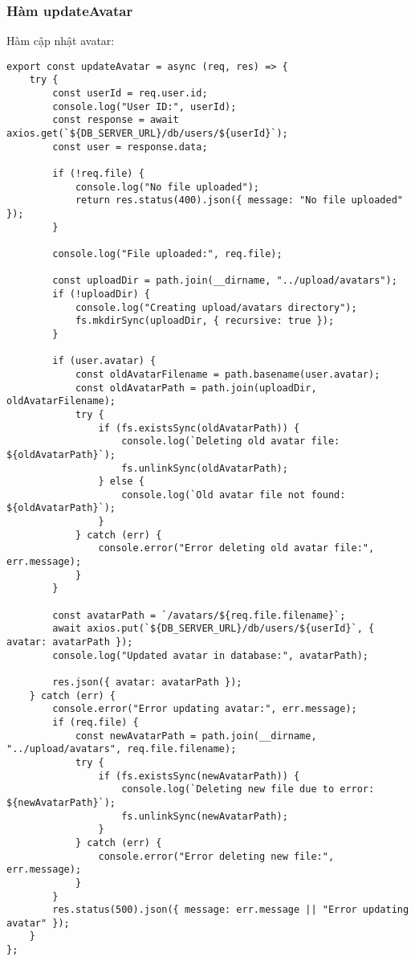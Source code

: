             \subsubsection{Hàm updateAvatar}
                \hspace*{0.6cm}Hàm cập nhật avatar:
                \begin{lstlisting}
export const updateAvatar = async (req, res) => {
    try {
        const userId = req.user.id;
        console.log("User ID:", userId);
        const response = await axios.get(`${DB_SERVER_URL}/db/users/${userId}`);
        const user = response.data;

        if (!req.file) {
            console.log("No file uploaded");
            return res.status(400).json({ message: "No file uploaded" });
        }

        console.log("File uploaded:", req.file);

        const uploadDir = path.join(__dirname, "../upload/avatars");
        if (!uploadDir) {
            console.log("Creating upload/avatars directory");
            fs.mkdirSync(uploadDir, { recursive: true });
        }

        if (user.avatar) {
            const oldAvatarFilename = path.basename(user.avatar);
            const oldAvatarPath = path.join(uploadDir, oldAvatarFilename);
            try {
                if (fs.existsSync(oldAvatarPath)) {
                    console.log(`Deleting old avatar file: ${oldAvatarPath}`);
                    fs.unlinkSync(oldAvatarPath);
                } else {
                    console.log(`Old avatar file not found: ${oldAvatarPath}`);
                }
            } catch (err) {
                console.error("Error deleting old avatar file:", err.message);
            }
        }

        const avatarPath = `/avatars/${req.file.filename}`;
        await axios.put(`${DB_SERVER_URL}/db/users/${userId}`, { avatar: avatarPath });
        console.log("Updated avatar in database:", avatarPath);

        res.json({ avatar: avatarPath });
    } catch (err) {
        console.error("Error updating avatar:", err.message);
        if (req.file) {
            const newAvatarPath = path.join(__dirname, "../upload/avatars", req.file.filename);
            try {
                if (fs.existsSync(newAvatarPath)) {
                    console.log(`Deleting new file due to error: ${newAvatarPath}`);
                    fs.unlinkSync(newAvatarPath);
                }
            } catch (err) {
                console.error("Error deleting new file:", err.message);
            }
        }
        res.status(500).json({ message: err.message || "Error updating avatar" });
    }
};
                \end{lstlisting}
